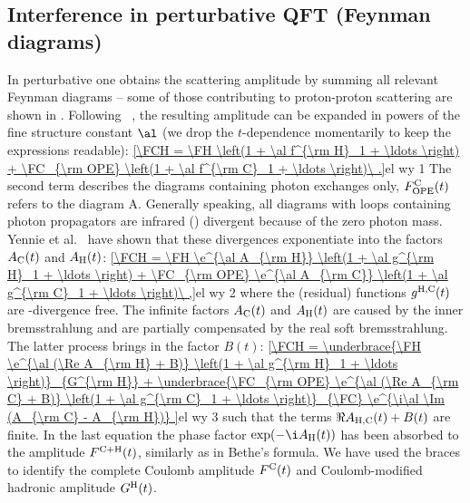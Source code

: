 \subsection[int qft]{Interference in perturbative QFT (Feynman diagrams)}



In perturbative  one obtains the scattering amplitude by summing all relevant Feynman diagrams -- some of those contributing to proton-proton scattering are shown in . Following \WaY\ , the resulting amplitude can be expanded in powers of the fine structure constant $\al$ (we drop the $t$-dependence momentarily to keep the expressions readable):
\eqref{\FCH = \FH \left(1 + \al f^{\rm H}_1 + \ldots \right) + \FC_{\rm OPE} \left(1 + \al f^{\rm C}_1 + \ldots \right)\ .}{el wy 1}
The second term describes the diagrams containing photon exchanges only, $F^{\rm C}_{\rm OPE}(t)$ refers to the diagram  A. Generally speaking, all diagrams with loops containing photon propagators are infrared () divergent because of the zero photon mass. Yennie et al.\  have shown that these divergences exponentiate into the factors $A_{\rm C}(t)$ and $A_{\rm H}(t)$:
\eqref{\FCH = \FH \e^{\al A_{\rm H}} \left(1 + \al g^{\rm H}_1 + \ldots \right) + \FC_{\rm OPE} \e^{\al A_{\rm C}} \left(1 + \al g^{\rm C}_1 + \ldots \right)\ ,}{el wy 2}
where the (residual) functions $g^{\rm H, C}(t)$ are -divergence free. The infinite factors $A_{\rm C}(t)$ and $A_{\rm H}(t)$ are caused by the inner bremsstrahlung and are partially compensated by the real soft bremsstrahlung. The latter process brings in the factor $B(t)$:
\eqref{\FCH =
\underbrace{\FH \e^{\al (\Re A_{\rm H} + B)} \left(1 + \al g^{\rm H}_1 + \ldots \right)}_{G^{\rm H}}
+
\underbrace{\FC_{\rm OPE} \e^{\al (\Re A_{\rm C} + B)} \left(1 + \al g^{\rm C}_1 + \ldots \right)}_{\FC}
\e^{\i\al \Im (A_{\rm C} - A_{\rm H})}
}{el wy 3}
such that the terms $\Re A_{\rm H, C}(t) + B(t)$ are finite. In the last equation the phase factor $\exp(-\i A_{\rm H}(t))$ has been absorbed to the amplitude $F^{\rm C+H}(t)$, similarly as in Bethe's formula. We have used the braces to identify the complete Coulomb amplitude $F^{\rm C}(t)$ and Coulomb-modified hadronic amplitude $G^{\rm H}(t)$.

